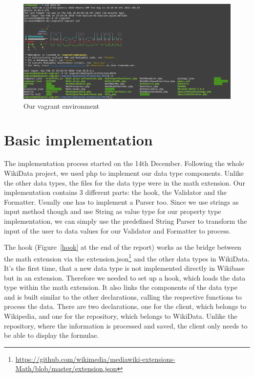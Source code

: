 \documentclass[12pt]{article}
\begin{document}
\begin{figure}[h]
\includegraphics[width = \textwidth]{vagrant}
\caption{Our vagrant environment}
\label{vagrant}
\end{figure}

\section{Basic implementation}
\paragraph{}
The implementation process started on the 14th December. 
Following the whole WikiData project, we used php to implement our data type components.
Unlike the other data types, the files for the data type were in the math extension.
Our implementation contains 3 different parts: the hook, the Validator and the Formatter. Usually one has to implement a Parser too. Since we use strings as input method though and use String as value type for our property type implementation, we can simply use the predefined String Parser to transform the input of the user to data values for our Validator and Formatter to process.

The hook (Figure~\ref{hook} at the end of the report) works as the bridge between the math extension via the extension.json\footnote{\url{https://github.com/wikimedia/mediawiki-extensions-Math/blob/master/extension.json}} and the other data types in WikiData. It's the first time, that a new data type is not implemented directly in Wikibase but in an extension. Therefore we needed to set up a hook, which loads the data type within the math extension. It also links the components of the data type and is built similar to the other declarations, calling the respective functions to process the data. There are two declarations, one for the client, which belongs to Wikipedia, and one for the repository, which belongs to WikiData. Unlike the repository, where the information is processed and saved, the client only needs to be able to display the formulae. 
\end{document}
